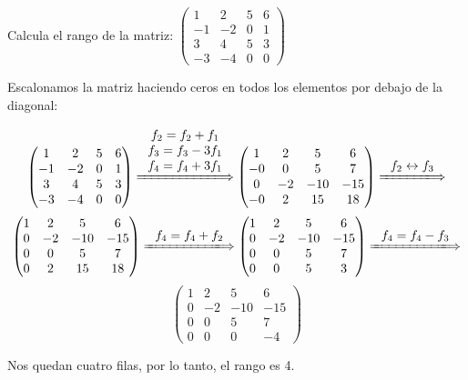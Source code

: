 \begin{ejemplo}

Calcula el rango de la matriz:
$ 
\begin{pmatrix}
	1 & 2 & 5 & 6 \\
	-1 & -2 & 0 & 1 \\
	3 & 4 & 5 & 3 \\
	-3 & -4 & 0 & 0  
\end{pmatrix}
$

\tcblower

Escalonamos la matriz haciendo ceros en todos los elementos por debajo de la diagonal:

\[
\begin{pmatrix}
	1 & 2 & 5 & 6 \\
	-1 & -2 & 0 & 1 \\
	3 & 4 & 5 & 3 \\
	-3 & -4 & 0 & 0  
\end{pmatrix} 
\xLongrightarrow{\begin{array}{c} f_2=f_2+f_1 \\ f_3=f_3-3f_1 \\  f_4=f_4+3f_1 \end{array}}
\begin{pmatrix}
	1 & 2 & 5 & 6 \\
	-0 & 0 & 5 & 7 \\
	0 & -2 & -10 & -15 \\
	-0 & 2 & 15 & 18  
\end{pmatrix} 
\xLongrightarrow{\begin{array}{c} f_2\leftrightarrow f_3  \end{array}}
\]
\[
\begin{pmatrix}
	1 & 2 & 5 & 6 \\
	0 & -2 & -10 & -15 \\
	0 & 0 & 5 & 7 \\
	0 & 2 & 15 & 18  
\end{pmatrix} 
\xLongrightarrow{\begin{array}{c} f_4=f_4+f_2  \end{array}}
\begin{pmatrix}
	1 & 2 & 5 & 6 \\
	0 & -2 & -10 & -15 \\
	0 & 0 & 5 & 7 \\
	0 & 0 & 5 & 3 
\end{pmatrix} 
\xLongrightarrow{\begin{array}{c} f_4=f_4-f_3  \end{array}}
\]
\[
\begin{pmatrix}
	1 & 2 & 5 & 6 \\
	0 & -2 & -10 & -15 \\
	0 & 0 & 5 & 7 \\
	0 & 0 & 0 & -4  
\end{pmatrix} 
\]

Nos quedan cuatro filas, por lo tanto, el rango es 4.

\end{ejemplo}

